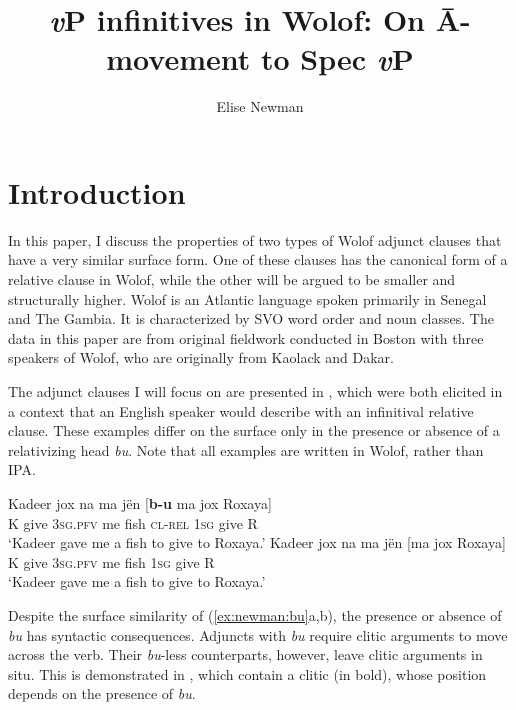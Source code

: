 \documentclass[output=paper]{langscibook}
\author{Elise Newman\affiliation{MIT}}
\title{{\textit{v}P} infinitives in {Wolof}: {On} {\={A}-movement} to {Spec} {\textit{v}P}}
\begin{document}
\maketitle

\section{Introduction} \label{sec:newman:intro}



In this paper, I discuss the properties of two types of Wolof adjunct clauses that have a very similar surface form. One of these clauses has the canonical form of a relative clause in Wolof, while the other will be argued to be smaller and structurally higher. Wolof is an Atlantic language spoken primarily in Senegal and The Gambia. It is characterized by SVO word order and noun classes. The data in this paper are from original fieldwork conducted in Boston with three speakers of Wolof, who are originally from Kaolack and Dakar.

The adjunct clauses I will focus on are presented in , which were both elicited in a context that an English speaker would describe with an infinitival relative clause. These examples differ on the surface only in the presence or absence of a relativizing head \emph{bu}. Note that all examples are written in Wolof, rather than IPA.

\begin{exe}
	\ex \label{ex:newman:bu} \begin{xlist}
		\ex 
		\gll Kadeer jox na ma j\"en [\textbf{b-u} ma jox Roxaya] \\
		K give \textsc{3sg.pfv} me fish \textsc{cl-rel} \textsc{1sg} give R \\
		\trans `Kadeer gave me a fish to give to Roxaya.'
		\ex 
		\gll Kadeer jox na ma j\"en [ma jox Roxaya] \\
		K give \textsc{3sg.pfv} me fish \textsc{1sg} give R \\
		\trans `Kadeer gave me a fish to give to Roxaya.'
	\end{xlist}
\end{exe}

Despite the surface similarity of (\ref{ex:newman:bu}a,b), the presence or absence of \emph{bu} has syntactic consequences. Adjuncts with \emph{bu} require clitic arguments to move across the verb. Their \emph{bu}-less counterparts, however, leave clitic arguments in situ. This is demonstrated in , which contain a clitic (in bold), whose position depends on the presence of \emph{bu}.
\end{document}

